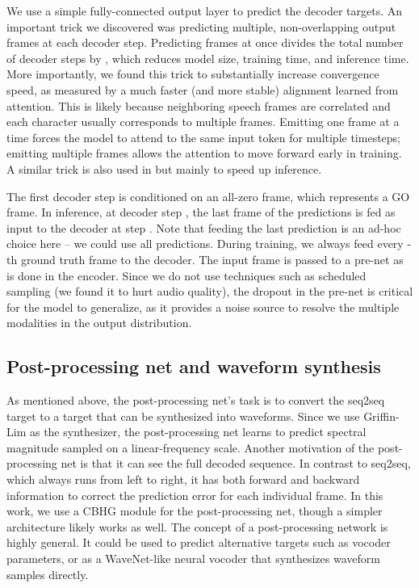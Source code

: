 \documentclass{article} \usepackage{iclr2017_conference,times}
\begin{document}
We use a simple fully-connected output layer to predict the decoder targets. An important trick we discovered was predicting multiple, non-overlapping output frames at each decoder step.  Predicting  frames at once divides the total number of decoder steps by , which reduces model size, training time, and inference time.  More importantly, we found this trick to substantially increase convergence speed, as measured by a much faster (and more stable) alignment learned from attention. This is likely because neighboring speech frames are correlated and each character usually corresponds to multiple frames. Emitting one frame at a time forces the model to attend to the same input token for multiple timesteps; emitting multiple frames allows the attention to move forward early in training. A similar trick is also used in \cite{zen2016fast} but mainly to speed up inference.

The first decoder step is conditioned on an all-zero frame, which represents a GO frame. In inference, at decoder step , the last frame of the  predictions is fed as input to the decoder at step .  Note that feeding the last prediction is an ad-hoc choice here -- we could use all  predictions. During training, we always feed every -th ground truth frame to the decoder. The input frame is passed to a pre-net as is done in the encoder. Since we do not use techniques such as scheduled sampling \citep{bengio2015scheduled} (we found it to hurt audio quality), the dropout in the pre-net is critical for the model to generalize, as it provides a noise source to resolve the multiple modalities in the output distribution.

\subsection{Post-processing net and waveform synthesis}
As mentioned above, the post-processing net's task is to convert the seq2seq target to a target that can be synthesized into waveforms. Since we use Griffin-Lim as the synthesizer, the post-processing net learns to predict spectral magnitude sampled on a linear-frequency scale. Another motivation of the post-processing net is that it can see the full decoded sequence. In contrast to seq2seq, which always runs from left to right, it has both forward and backward information to correct the prediction error for each individual frame. In this work, we use a CBHG module for the post-processing net, though a simpler architecture likely works as well. The concept of a post-processing network is highly general. It could be used to predict alternative targets such as vocoder parameters, or as a WaveNet-like neural vocoder \citep{van2016wavenet, mehri2016samplernn, arik2017deep} that synthesizes waveform samples directly.
\end{document}

